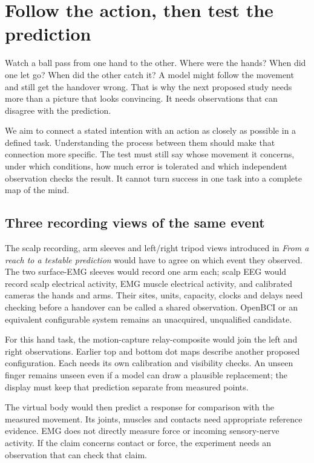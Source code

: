 \section{Follow the action, then test the prediction}

Watch a ball pass from one hand to the other. Where were the hands? When did one
let go? When did the other catch it? A model might follow the movement and still
get the handover wrong. That is why the next proposed study needs more than a
picture that looks convincing. It needs observations that can disagree with the
prediction.

We aim to connect a stated intention with an action as closely as possible in a
defined task. Understanding the process between them should make that connection
more specific. The test must still say whose movement it concerns, under which
conditions, how much error is tolerated and which independent observation checks
the result. It cannot turn success in one task into a complete map of the mind.

\subsection{Three recording views of the same event}

The scalp recording, arm sleeves and left/right tripod views introduced in
\emph{From a reach to a testable prediction} would have to agree on which event
they observed. The two surface-EMG sleeves would record one arm each; scalp EEG
would record scalp electrical activity, EMG muscle electrical activity, and
calibrated cameras the hands and arms. Their sites, units, capacity, clocks and
delays need checking before a handover can be called a shared observation.
OpenBCI or an equivalent configurable system remains an unacquired, unqualified
candidate.

For this hand task, the motion-capture relay-composite would join the left and
right observations. Earlier top and bottom dot maps describe another proposed
configuration. Each needs its own calibration and visibility checks. An unseen
finger remains unseen even if a model can draw a plausible replacement; the
display must keep that prediction separate from measured points.

The virtual body would then predict a response for comparison with the measured
movement. Its joints, muscles and contacts need appropriate reference evidence.
EMG does not directly measure force or incoming sensory-nerve activity. If the
claim concerns contact or force, the experiment needs an observation that can
check that claim.

